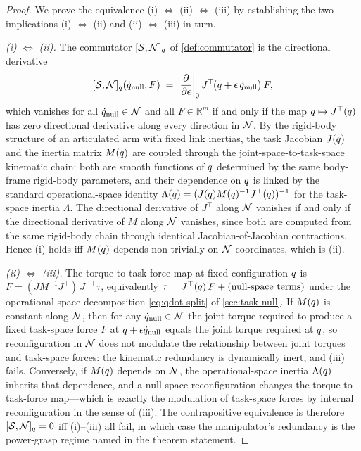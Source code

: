 \begin{proof}
We prove the equivalence (i) $\Leftrightarrow$ (ii)
$\Leftrightarrow$ (iii) by establishing the two implications
(i) $\Leftrightarrow$ (ii) and (ii) $\Leftrightarrow$ (iii) in
turn.

\emph{(i) $\Leftrightarrow$ (ii).} The commutator
$[\mathcal{S}, \mathcal{N}]_{q}$ of \cref{def:commutator} is the
directional derivative
\[
  [\mathcal{S}, \mathcal{N}]_{q}(\dot{q}_{\mathrm{null}}, F)
  \;=\;
  \left.\frac{\partial}{\partial \epsilon}\right|_{0}
  J^{\top}\!\bigl(q + \epsilon\, \dot{q}_{\mathrm{null}}\bigr)\, F,
\]
which vanishes for all
$\dot{q}_{\mathrm{null}} \in \mathcal{N}$ and all
$F \in \mathbb{R}^{m}$ if and only if the map
$q \mapsto J^{\top}(q)$ has zero directional
derivative along every direction in $\mathcal{N}$. By the rigid-body
structure of an articulated arm with fixed link inertias, the
task Jacobian $J(q)$ and the inertia matrix
$M(q)$ are coupled through the joint-space-to-task-space
kinematic chain: both are smooth functions of $q$
determined by the same body-frame rigid-body parameters, and
their dependence on $q$ is linked by the standard
operational-space identity
$\Lambda(q) = (J(q) M(q)^{-1}
J^{\top}(q))^{-1}$ for the task-space inertia
$\Lambda$. The directional derivative of $J^{\top}$ along
$\mathcal{N}$ vanishes if and only if the directional derivative of
$M$ along $\mathcal{N}$ vanishes, since both are computed from the same
rigid-body chain through identical Jacobian-of-Jacobian
contractions. Hence (i) holds iff $M(q)$ depends
non-trivially on $\mathcal{N}$-coordinates, which is (ii).

\emph{(ii) $\Leftrightarrow$ (iii).} The torque-to-task-force
map at fixed configuration $q$ is
$F = (J M^{-1} J^{\top})\, J^{-\top} \tau$, equivalently
$\tau = J^{\top}(q)\, F + (\text{null-space terms})$
under the operational-space decomposition
\eqref{eq:qdot-split} of \cref{sec:task-null}. If
$M(q)$ is constant along $\mathcal{N}$, then for any
$\dot{q}_{\mathrm{null}} \in \mathcal{N}$ the joint torque
required to produce a fixed task-space force $F$ at
$q + \epsilon \dot{q}_{\mathrm{null}}$ equals
the joint torque required at $q$, so reconfiguration in
$\mathcal{N}$ does not modulate the relationship between joint torques
and task-space forces: the kinematic redundancy is dynamically
inert, and (iii) fails. Conversely, if $M(q)$ depends
on $\mathcal{N}$, the operational-space inertia $\Lambda(q)$
inherits that dependence, and a null-space reconfiguration
changes the torque-to-task-force map---which is exactly the
modulation of task-space forces by internal reconfiguration in
the sense of (iii). The contrapositive equivalence is therefore
$[\mathcal{S}, \mathcal{N}]_{q} = 0$ iff (i)--(iii) all fail, in which
case the manipulator's redundancy is the power-grasp regime
named in the theorem statement.
\end{proof}
